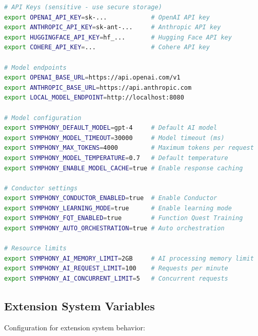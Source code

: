 \begin{lstlisting}[language=bash,caption={AI Configuration Variables}]
# API Keys (sensitive - use secure storage)
export OPENAI_API_KEY=sk-...            # OpenAI API key
export ANTHROPIC_API_KEY=sk-ant-...     # Anthropic API key
export HUGGINGFACE_API_KEY=hf_...       # Hugging Face API key
export COHERE_API_KEY=...               # Cohere API key

# Model endpoints
export OPENAI_BASE_URL=https://api.openai.com/v1
export ANTHROPIC_BASE_URL=https://api.anthropic.com
export LOCAL_MODEL_ENDPOINT=http://localhost:8080

# Model configuration
export SYMPHONY_DEFAULT_MODEL=gpt-4     # Default AI model
export SYMPHONY_MODEL_TIMEOUT=30000     # Model timeout (ms)
export SYMPHONY_MAX_TOKENS=4000         # Maximum tokens per request
export SYMPHONY_MODEL_TEMPERATURE=0.7   # Default temperature
export SYMPHONY_ENABLE_MODEL_CACHE=true # Enable response caching

# Conductor settings
export SYMPHONY_CONDUCTOR_ENABLED=true  # Enable Conductor
export SYMPHONY_LEARNING_MODE=true      # Enable learning mode
export SYMPHONY_FQT_ENABLED=true        # Function Quest Training
export SYMPHONY_AUTO_ORCHESTRATION=true # Auto orchestration

# Resource limits
export SYMPHONY_AI_MEMORY_LIMIT=2GB     # AI processing memory limit
export SYMPHONY_AI_REQUEST_LIMIT=100    # Requests per minute
export SYMPHONY_AI_CONCURRENT_LIMIT=5   # Concurrent requests
\end{lstlisting}

\subsection*{Extension System Variables}

Configuration for extension system behavior:

